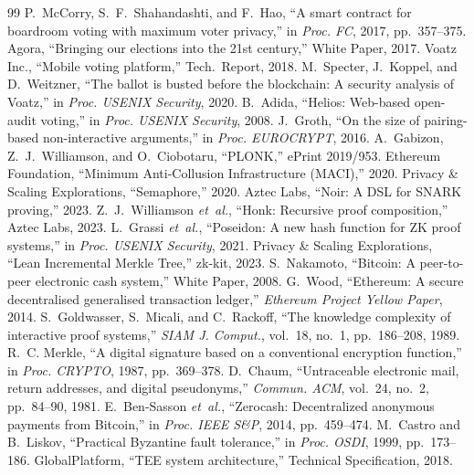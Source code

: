 \documentclass[conference]{IEEEtran}
\theoremstyle{definition}
\theoremstyle{plain}
\begin{document}

\begin{thebibliography}{99}
 P.~McCorry, S.~F.~Shahandashti, and F.~Hao, ``A smart contract for boardroom voting with maximum voter privacy,'' in \emph{Proc. FC}, 2017, pp.~357--375.
 Agora, ``Bringing our elections into the 21st century,'' White Paper, 2017.
 Voatz Inc., ``Mobile voting platform,'' Tech.\ Report, 2018.
 M.~Specter, J.~Koppel, and D.~Weitzner, ``The ballot is busted before the blockchain: A security analysis of Voatz,'' in \emph{Proc. USENIX Security}, 2020.
 B.~Adida, ``Helios: Web-based open-audit voting,'' in \emph{Proc. USENIX Security}, 2008.
 J.~Groth, ``On the size of pairing-based non-interactive arguments,'' in \emph{Proc. EUROCRYPT}, 2016.
 A.~Gabizon, Z.~J.~Williamson, and O.~Ciobotaru, ``PLONK,'' ePrint 2019/953.
 Ethereum Foundation, ``Minimum Anti-Collusion Infrastructure (MACI),'' 2020.
 Privacy \& Scaling Explorations, ``Semaphore,'' 2020.
 Aztec Labs, ``Noir: A DSL for SNARK proving,'' 2023.
 Z.~J.~Williamson \emph{et~al.}, ``Honk: Recursive proof composition,'' Aztec Labs, 2023.
 L.~Grassi \emph{et~al.}, ``Poseidon: A new hash function for ZK proof systems,'' in \emph{Proc. USENIX Security}, 2021.
 Privacy \& Scaling Explorations, ``Lean Incremental Merkle Tree,'' zk-kit, 2023.
 S.~Nakamoto, ``Bitcoin: A peer-to-peer electronic cash system,'' White Paper, 2008.
 G.~Wood, ``Ethereum: A secure decentralised generalised transaction ledger,'' \emph{Ethereum Project Yellow Paper}, 2014.
 S.~Goldwasser, S.~Micali, and C.~Rackoff, ``The knowledge complexity of interactive proof systems,'' \emph{SIAM J. Comput.}, vol.~18, no.~1, pp.~186--208, 1989.
 R.~C. Merkle, ``A digital signature based on a conventional encryption function,'' in \emph{Proc. CRYPTO}, 1987, pp.~369--378.
 D.~Chaum, ``Untraceable electronic mail, return addresses, and digital pseudonyms,'' \emph{Commun. ACM}, vol.~24, no.~2, pp.~84--90, 1981.
 E.~Ben-Sasson \emph{et~al.}, ``Zerocash: Decentralized anonymous payments from Bitcoin,'' in \emph{Proc. IEEE S\&P}, 2014, pp.~459--474.
 M.~Castro and B.~Liskov, ``Practical Byzantine fault tolerance,'' in \emph{Proc. OSDI}, 1999, pp.~173--186.
 GlobalPlatform, ``TEE system architecture,'' Technical Specification, 2018.
\end{thebibliography}
\end{document}
